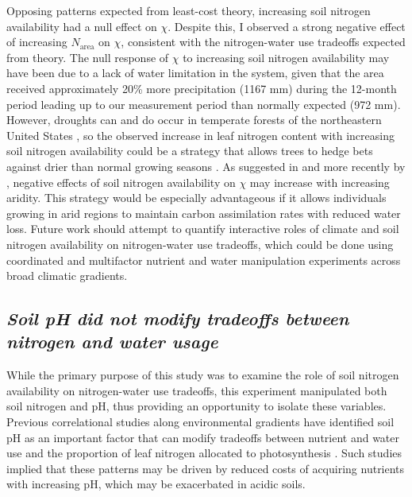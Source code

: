 Opposing patterns expected from least-cost theory, increasing soil nitrogen availability had a null effect on $\chi$. Despite this, I observed a strong negative effect of increasing $N_\mathrm{area}$ on $\chi$, consistent with the nitrogen-water use tradeoffs expected from theory. The null response of $\chi$ to increasing soil nitrogen availability may have been due to a lack of water limitation in the system, given that the area received approximately 20\% more precipitation (1167 mm) during the 12-month period leading up to our measurement period than normally expected (972 mm). However, droughts can and do occur in temperate forests of the northeastern United States , so the observed increase in leaf nitrogen content with increasing soil nitrogen availability could be a strategy that allows trees to hedge bets against drier than normal growing seasons . As suggested in  and more recently by , negative effects of soil nitrogen availability on $\chi$ may increase with increasing aridity. This strategy would be especially advantageous if it allows individuals growing in arid regions to maintain carbon assimilation rates with reduced water loss. Future work should attempt to quantify interactive roles of climate and soil nitrogen availability on nitrogen-water use tradeoffs, which could be done using coordinated and multifactor nutrient  and water  manipulation experiments across broad climatic gradients.
    
\subsection{\textit{Soil pH did not modify tradeoffs between nitrogen and water usage}}
\noindent While the primary purpose of this study was to examine the role of soil nitrogen availability on nitrogen-water use tradeoffs, this experiment manipulated both soil nitrogen and pH, thus providing an opportunity to isolate these variables. Previous correlational studies along environmental gradients have identified soil pH as an important factor that can modify tradeoffs between nutrient and water use  and the proportion of leaf nitrogen allocated to photosynthesis . Such studies implied that these patterns may be driven by reduced costs of acquiring nutrients with increasing pH, which may be exacerbated in acidic soils.

